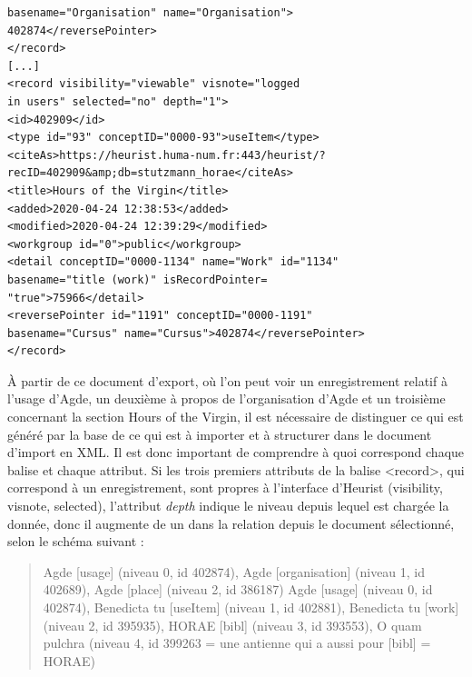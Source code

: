 \documentclass[a4paper,12pt,twoside]{book}
\begin{document}
\begin{verbatim}
basename="Organisation" name="Organisation">
402874</reversePointer>
</record>
[...]
<record visibility="viewable" visnote="logged 
in users" selected="no" depth="1">
<id>402909</id>
<type id="93" conceptID="0000-93">useItem</type>
<citeAs>https://heurist.huma-num.fr:443/heurist/?
recID=402909&amp;db=stutzmann_horae</citeAs>
<title>Hours of the Virgin</title>
<added>2020-04-24 12:38:53</added>
<modified>2020-04-24 12:39:29</modified>
<workgroup id="0">public</workgroup>
<detail conceptID="0000-1134" name="Work" id="1134"
basename="title (work)" isRecordPointer=
"true">75966</detail>
<reversePointer id="1191" conceptID="0000-1191" 
basename="Cursus" name="Cursus">402874</reversePointer>
</record>
	\end{verbatim}
	
À partir de ce document d'export, où l'on peut voir un enregistrement relatif à l'usage d'Agde, un deuxième à propos de l'organisation d'Agde et un troisième concernant la section \og Hours of the Virgin\fg{}, il est nécessaire de distinguer ce qui est généré par la base de ce qui est à importer et à structurer dans le document d'import en XML. Il est donc important de comprendre à quoi correspond chaque balise et chaque attribut. Si les trois premiers attributs de la balise \textless record\textgreater , qui correspond à un enregistrement, sont propres à l'interface d'Heurist (visibility, visnote, selected), l'attribut \textit{depth} indique le niveau depuis lequel est chargée la donnée, donc il augmente de un dans la relation depuis le document sélectionné, selon le schéma suivant :
\begin{quote}
Agde [usage] (niveau 0, id 402874), Agde [organisation] (niveau 1, id 402689), Agde [place] (niveau 2, id 386187)
Agde [usage] (niveau 0, id 402874), Benedicta tu [useItem] (niveau 1, id 402881), Benedicta tu [work] (niveau 2, id 395935), HORAE [bibl] (niveau 3, id 393553), O quam pulchra (niveau 4, id 399263 = une antienne qui a aussi pour [bibl] = HORAE)   
\end{quote}
\end{document}
